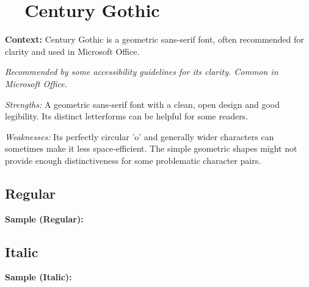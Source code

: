 \pagebreak
\section{~~Century Gothic}\label{app5:sec:centurygothic}
\noindent
\textbf{Context:} Century Gothic is a geometric sans-serif font, often recommended for clarity and used in Microsoft Office.

\emph{Recommended by some accessibility guidelines for its clarity. Common in Microsoft Office.}
\begin{raggedright}
	\emph{Strengths:} A geometric sans-serif font with a clean, open design and good legibility. Its distinct letterforms can be helpful for some readers.

	\emph{Weaknesses:} Its perfectly circular 'o' and generally wider characters can sometimes make it less space-efficient. The simple geometric shapes might not provide enough distinctiveness for some problematic character pairs.

	\subsection{Regular}
	\noindent\textbf{Sample (Regular):}
	\FontSample{\centurygothicfont}

	\subsection{Italic}
	\noindent\textbf{Sample (Italic):}
	\FontSample{{\centurygothicfont\itshape}}
\end{raggedright}

